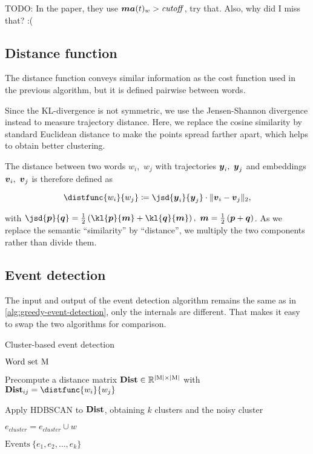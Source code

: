 {\color{red} TODO: In the paper, they use $\vect{MA}(t)_{w} > \mathit{cutoff}$, try that. Also, why did I miss that? :(}


\subsection{Distance function}
The distance function conveys similar information as the cost function used in the previous algorithm, but it is defined pairwise between words.

Since the KL-divergence is not symmetric, we use the Jensen-Shannon divergence instead to measure trajectory distance. Here, we replace the cosine similarity by standard Euclidean distance to make the points spread farther apart, which helps to obtain better clustering.

The distance between two words $w_{i}$,\ $w_{j}$ with trajectories $\vect{\traj}_{i},\ \vect{\traj}_{j}$ and embeddings $\embed_{i},\ \embed_{j}$ is therefore defined as

\begin{equation}
	\distfunc{w_{i}}{w_{j}} \coloneqq \jsd{\vect{\traj}_{i}}{\vect{\traj}_{j}} \cdot \| \embed_{i} - \embed_{j}\|_{2},
\end{equation}

with $\jsd{\vect{p}}{\vect{q}} = \frac{1}{2} \left( \kl{\vect{p}}{\vect{m}} + \kl{\vect{q}}{\vect{m}} \right) ,\ \vect{m} = \frac{1}{2} \left( \vect{p} + \vect{q} \right)$. As we replace the semantic ``similarity'' by ``distance'', we multiply the two components rather than divide them.


\subsection{Event detection}
The input and output of the event detection algorithm remains the same as in \ref{alg:greedy-event-detection}, only the internals are different. That makes it easy to swap the two algorithms for comparison.

\begin{algorithm}[H]
\begin{algorithmic}[1]
\caption{Cluster-based event detection}
\Input $\text{Word set} ~ \text{M}$

\State Precompute a distance matrix $\mathbf{Dist} \in \mathbb{R}^{\left\vert \text{M} \right\vert \times \left\vert \text{M} \right\vert}$ with $\distmat_{ij} = \distfunc{w_{i}}{w_{j}}$

\State Apply HDBSCAN to $\mathbf{Dist}$, obtaining $k$ clusters and the noisy cluster

		\State $e_{cluster} = e_{cluster} \cup w$
	\EndIf
\EndFor

\Output $\text{Events} ~ \{ e_{1}, e_{2}, \dots, e_{k} \}$
\end{algorithmic}
\end{algorithm}

